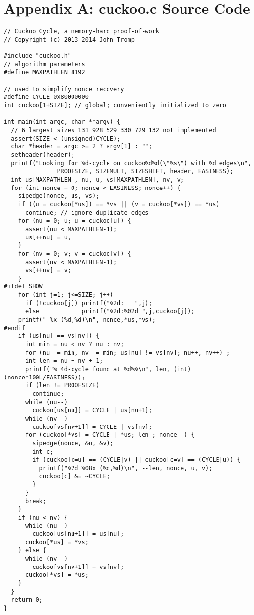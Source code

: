 \documentclass[11pt, oneside]{article}
\begin{document}
\section{Appendix A: cuckoo.c Source Code}
\footnotesize
\begin{verbatim}
// Cuckoo Cycle, a memory-hard proof-of-work
// Copyright (c) 2013-2014 John Tromp

#include "cuckoo.h"
// algorithm parameters
#define MAXPATHLEN 8192

// used to simplify nonce recovery
#define CYCLE 0x80000000
int cuckoo[1+SIZE]; // global; conveniently initialized to zero

int main(int argc, char **argv) {
  // 6 largest sizes 131 928 529 330 729 132 not implemented
  assert(SIZE < (unsigned)CYCLE);
  char *header = argc >= 2 ? argv[1] : "";
  setheader(header);
  printf("Looking for %d-cycle on cuckoo%d%d(\"%s\") with %d edges\n",
               PROOFSIZE, SIZEMULT, SIZESHIFT, header, EASINESS);
  int us[MAXPATHLEN], nu, u, vs[MAXPATHLEN], nv, v; 
  for (int nonce = 0; nonce < EASINESS; nonce++) {
    sipedge(nonce, us, vs);
    if ((u = cuckoo[*us]) == *vs || (v = cuckoo[*vs]) == *us)
      continue; // ignore duplicate edges
    for (nu = 0; u; u = cuckoo[u]) {
      assert(nu < MAXPATHLEN-1);
      us[++nu] = u;
    }
    for (nv = 0; v; v = cuckoo[v]) {
      assert(nv < MAXPATHLEN-1);
      vs[++nv] = v;
    }
#ifdef SHOW
    for (int j=1; j<=SIZE; j++)
      if (!cuckoo[j]) printf("%2d:   ",j);
      else            printf("%2d:%02d ",j,cuckoo[j]);
    printf(" %x (%d,%d)\n", nonce,*us,*vs);
#endif
    if (us[nu] == vs[nv]) {
      int min = nu < nv ? nu : nv;
      for (nu -= min, nv -= min; us[nu] != vs[nv]; nu++, nv++) ;
      int len = nu + nv + 1;
      printf("% 4d-cycle found at %d%%\n", len, (int)(nonce*100L/EASINESS));
      if (len != PROOFSIZE)
        continue;
      while (nu--)
        cuckoo[us[nu]] = CYCLE | us[nu+1];
      while (nv--)
        cuckoo[vs[nv+1]] = CYCLE | vs[nv];
      for (cuckoo[*vs] = CYCLE | *us; len ; nonce--) {
        sipedge(nonce, &u, &v);
        int c;
        if (cuckoo[c=u] == (CYCLE|v) || cuckoo[c=v] == (CYCLE|u)) {
          printf("%2d %08x (%d,%d)\n", --len, nonce, u, v);
          cuckoo[c] &= ~CYCLE;
        }
      }
      break;
    }
    if (nu < nv) {
      while (nu--)
        cuckoo[us[nu+1]] = us[nu];
      cuckoo[*us] = *vs;
    } else {
      while (nv--)
        cuckoo[vs[nv+1]] = vs[nv];
      cuckoo[*vs] = *us;
    }
  }
  return 0;
}
\end{verbatim}
\end{document}
